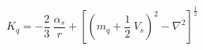 \begin{equation}
K_q= -\frac{2}{3}~\frac{\alpha_s}{r} + [(m_q +\frac{1}{2}~V_s)^2 -\nabla^2]^{\frac{1}{2}}  \nonumber
\end{equation}

